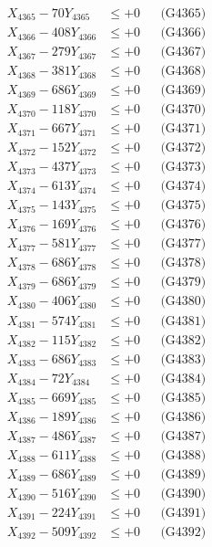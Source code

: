 \documentclass[a4paper,10pt]{article}
\begin{document}
{\begin{align}
X_{4365} - 70Y_{4365} &\leq +0 && \text{(G4365)} \\
X_{4366} - 408Y_{4366} &\leq +0 && \text{(G4366)} \\
X_{4367} - 279Y_{4367} &\leq +0 && \text{(G4367)} \\
X_{4368} - 381Y_{4368} &\leq +0 && \text{(G4368)} \\
X_{4369} - 686Y_{4369} &\leq +0 && \text{(G4369)} \\
X_{4370} - 118Y_{4370} &\leq +0 && \text{(G4370)} \\
\allowbreak
X_{4371} - 667Y_{4371} &\leq +0 && \text{(G4371)} \\
X_{4372} - 152Y_{4372} &\leq +0 && \text{(G4372)} \\
X_{4373} - 437Y_{4373} &\leq +0 && \text{(G4373)} \\
X_{4374} - 613Y_{4374} &\leq +0 && \text{(G4374)} \\
X_{4375} - 143Y_{4375} &\leq +0 && \text{(G4375)} \\
X_{4376} - 169Y_{4376} &\leq +0 && \text{(G4376)} \\
X_{4377} - 581Y_{4377} &\leq +0 && \text{(G4377)} \\
X_{4378} - 686Y_{4378} &\leq +0 && \text{(G4378)} \\
X_{4379} - 686Y_{4379} &\leq +0 && \text{(G4379)} \\
X_{4380} - 406Y_{4380} &\leq +0 && \text{(G4380)} \\
\allowbreak
X_{4381} - 574Y_{4381} &\leq +0 && \text{(G4381)} \\
X_{4382} - 115Y_{4382} &\leq +0 && \text{(G4382)} \\
X_{4383} - 686Y_{4383} &\leq +0 && \text{(G4383)} \\
X_{4384} - 72Y_{4384} &\leq +0 && \text{(G4384)} \\
X_{4385} - 669Y_{4385} &\leq +0 && \text{(G4385)} \\
X_{4386} - 189Y_{4386} &\leq +0 && \text{(G4386)} \\
X_{4387} - 486Y_{4387} &\leq +0 && \text{(G4387)} \\
X_{4388} - 611Y_{4388} &\leq +0 && \text{(G4388)} \\
X_{4389} - 686Y_{4389} &\leq +0 && \text{(G4389)} \\
X_{4390} - 516Y_{4390} &\leq +0 && \text{(G4390)} \\
\allowbreak
X_{4391} - 224Y_{4391} &\leq +0 && \text{(G4391)} \\
X_{4392} - 509Y_{4392} &\leq +0 && \text{(G4392)} \\

\end{align}}
\end{document}
